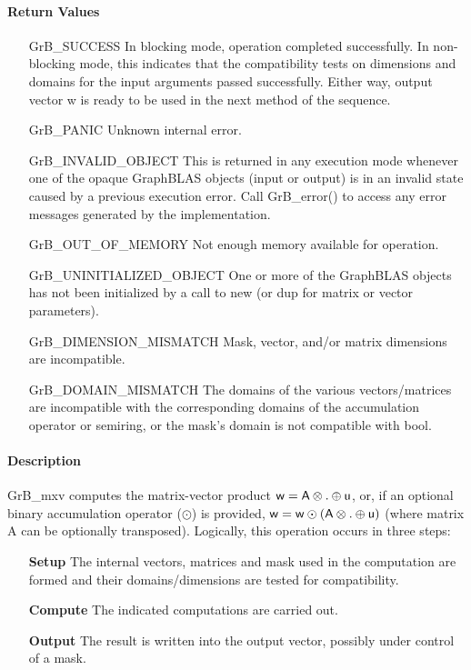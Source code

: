 \paragraph{Return Values}

\begin{itemize}[leftmargin=2.1in]
    \item[{\sf GrB\_SUCCESS}]         In blocking mode, operation
	completed successfully. In non-blocking mode, this indicates
	that the compatibility tests on dimensions and domains for the
	input arguments passed successfully. Either way, output vector
	{\sf w} is ready to be used in the next method of the sequence.

    \item[{\sf GrB\_PANIC}]           Unknown internal error.
    
    \item[{\sf GrB\_INVALID\_OBJECT}] This is returned in any execution mode 
    whenever one of the opaque GraphBLAS objects (input or output) is in an invalid 
    state caused by a previous execution error.  Call {GrB\_error()} to access 
    any error messages generated by the implementation.

    \item[{\sf GrB\_OUT\_OF\_MEMORY}]  Not enough memory available for operation.
    
    \item[{\sf GrB\_UNINITIALIZED\_OBJECT}] One or more of the GraphBLAS objects 
    has not been initialized by a call to {\sf new} (or {\sf dup} for matrix or
    vector parameters).

    \item[{\sf GrB\_DIMENSION\_MISMATCH}] Mask, vector, and/or matrix 
    dimensions are incompatible.

	\item[{\sf GrB\_DOMAIN\_MISMATCH}]    The domains of the various
	vectors/matrices are incompatible with the corresponding domains of the
	accumulation operator or semiring, or the mask's domain is not compatible with bool.
\end{itemize}

\paragraph{Description}

{\sf GrB\_mxv} computes the matrix-vector product ${\sf w} = {\sf A}
\otimes . \oplus {\sf u}$, or, if an optional binary accumulation
operator ($\odot$) is provided, ${\sf w} = {\sf w} \odot \left({\sf A}
\otimes . \oplus {\sf u}\right)$ (where matrix {\sf A}
 can be optionally transposed).  Logically, this operation
occurs in three steps:
\begin{enumerate}[leftmargin=0.85in]
\item[\bf Setup] The internal vectors, matrices and mask used in the computation are formed and their domains/dimensions are tested for compatibility.
\item[\bf Compute] The indicated computations are carried out.
\item[\bf Output] The result is written into the output vector, possibly under control of a mask.
\end{enumerate}


